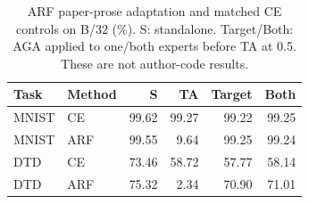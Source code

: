 \begin{table}[!htbp]
\centering
\small
\setlength{\tabcolsep}{3pt}
\caption{ARF paper-prose adaptation and matched CE controls on B/32 (\%). S: standalone. Target/Both: AGA applied to one/both experts before TA at 0.5. These are not author-code results.}
\label{tab:arf-adaptation}
\begin{tabular}{llrrrr}
\toprule
Task & Method & S & TA & Target & Both \\
\midrule
MNIST & CE & 99.62 & 99.27 & 99.22 & 99.25 \\
MNIST & ARF & 99.55 & 9.64 & 99.25 & 99.24 \\
DTD & CE & 73.46 & 58.72 & 57.77 & 58.14 \\
DTD & ARF & 75.32 & 2.34 & 70.90 & 71.01 \\
\bottomrule
\end{tabular}
\end{table}
